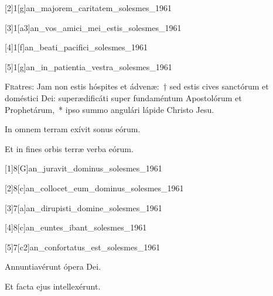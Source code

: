 \documentclass[vesperale_romanum.tex]{subfiles}
\begin{document}
[2]{1}[g]{an_majorem_caritatem_solesmes_1961} %

[3]{1}[a3]{an_vos_amici_mei_estis_solesmes_1961} 

[4]{1}[f]{an_beati_pacifici_solesmes_1961}

[5]{1}[g]{an_in_patientia_vestra_solesmes_1961}

\label{cap_apostolorum}


\lettrine{F}{r}atres: Jam non estis hóspites et ádvenæ:~† sed estis cives sanctórum et doméstici Dei: superædificáti super fundaméntum Apostolórum et Prophetárum,~* ipso summo angulári lápide Christo Jesu.

\label{hy_exsultet_orbis_gaudiis_solesmes_1961} 

\hymnus
{}


 \vv In omnem terram exívit sonus eórum.
 
 \rr Et in fines orbis terræ verba eórum.



\label{2_vesperis_commune_apostolorum} 
{}

[1]{8}[G]{an_juravit_dominus_solesmes_1961}

[2]{8}[c]{an_collocet_eum_dominus_solesmes_1961}

[3]{7}[a]{an_dirupisti_domine_solesmes_1961}

[4]{8}[c]{an_euntes_ibant_solesmes_1961}

[5]{7}[c2]{an_confortatus_est_solesmes_1961}


 \vv Annuntiavérunt ópera Dei.
 
 \rr Et facta ejus intellexérunt.

\end{document}
